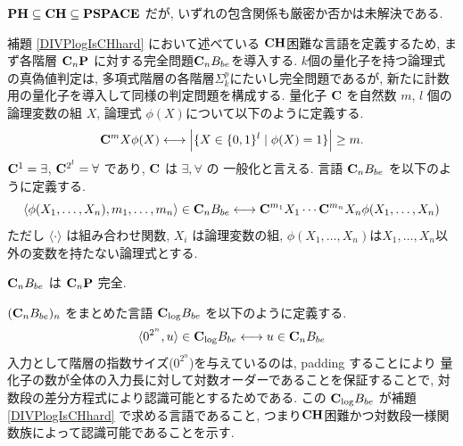 $\mathbf{PH} \subseteq \mathbf{CH} \subseteq \mathbf{PSPACE}$ だが,
いずれの包含関係も厳密か否かは未解決である.

補題 \ref{DIVPlogIsCHhard} において述べている $\mathbf{CH}$困難な言語を定義するため, 
まず各階層 $\mathbf{C}_n \mathbf{P}$ に対する完全問題$\mathbf{C}_n B_{be}$を導入する.
$k$個の量化子を持つ論理式の真偽値判定は,
多項式階層の各階層$\Sigma^p_k$にたいし完全問題であるが,
新たに計数用の量化子を導入して同様の判定問題を構成する.
量化子 $\mathbf{C}$ を自然数 $m$, $l$ 個の論理変数の組 $X$,
論理式 $\phi(X)$について以下のように定義する.
\begin{equation}
 \mathbf{C}^m X \phi(X) 
  \longleftrightarrow 
  \Bigl|\{X \in \{0, 1\}^l \mid \phi(X) = 1\}\Bigr| \ge m.
\end{equation}
$\mathbf{C}^1 = \exists$, $\mathbf{C}^{2^l} = \forall$ であり, $\mathbf{C}$ は $\exists, \forall$ の
一般化と言える.
言語 $\mathbf{C}_n B_{be}$ を以下のように定義する.
\begin{equation}
 \langle \phi(X_1, \dots, X_n), m_1, \dots, m_n \rangle \in \mathbf{C}_n B_{be}
 \longleftrightarrow
 \mathbf{C}^{m_1}{X_1} \cdots \mathbf{C}^{m_n}{X_n} \phi(X_1, \dots, X_n) 
\end{equation}
ただし $\langle \cdot \rangle$ は組み合わせ関数,
$X_i$ は論理変数の組,
$\phi(X_1, \dots, X_n)$は$X_1, \dots, X_n$以外の変数を持たない論理式とする.


\begin{lemma} \label{lemma:CnP-complete}
 $\mathbf{C}_n B_{be}$ は $\mathbf{C}_n\mathbf{P}$ 完全.
\end{lemma}


$(\mathbf{C}_n B_{be})_n$ をまとめた言語 $\mathbf{C}_{\log} B_{be}$ を以下のように定義する.
\begin{equation}
 \langle 0^{2^n}, u \rangle \in \mathbf{C}_{\log} B_{be}
 \longleftrightarrow
 u \in \mathbf{C}_n B_{be}
\end{equation}
入力として階層の指数サイズ($0^{2^n}$)を与えているのは, padding することにより
量化子の数が全体の入力長に対して対数オーダーであることを保証することで,
対数段の差分方程式により認識可能とするためである.
この $\mathbf{C}_{\log} B_{be}$ が補題 \ref{DIVPlogIsCHhard} で求める言語であること,
つまり$\mathbf{CH}$困難かつ対数段一様関数族によって認識可能であることを示す.


